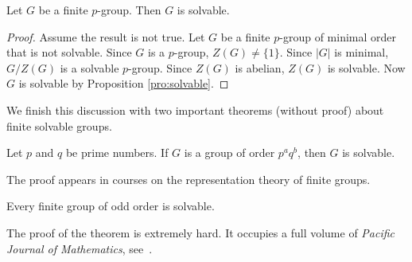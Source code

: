 \begin{proposition}
    Let $G$ be a finite $p$-group. Then $G$ is solvable. 
\end{proposition}

\begin{proof}
    Assume the result is not true. Let $G$ be a finite
    $p$-group of minimal order that is not solvable. Since 
    $G$ is a $p$-group, $Z(G)\ne\{1\}$. Since $|G|$ is minimal, 
    $G/Z(G)$ is a solvable $p$-group. Since $Z(G)$ is abelian, 
    $Z(G)$ is solvable. Now $G$ is solvable 
    by Proposition \ref{pro:solvable}.
\end{proof}

We finish this discussion with two important theorems (without proof) 
about finite solvable groups. 

\begin{theorem}[Burnside]
    Let $p$ and $q$ be prime numbers. If $G$ is a group
    of order $p^aq^b$, then $G$ is solvable. 
\end{theorem}

The proof appears in courses on the 
representation theory of finite groups. 

\begin{theorem}
    Every finite group of odd order is solvable.
\end{theorem}

The proof of the theorem is extremely hard. It occupies a full volume of
\emph{Pacific Journal of Mathematics}, see~\cite{MR166261}.

